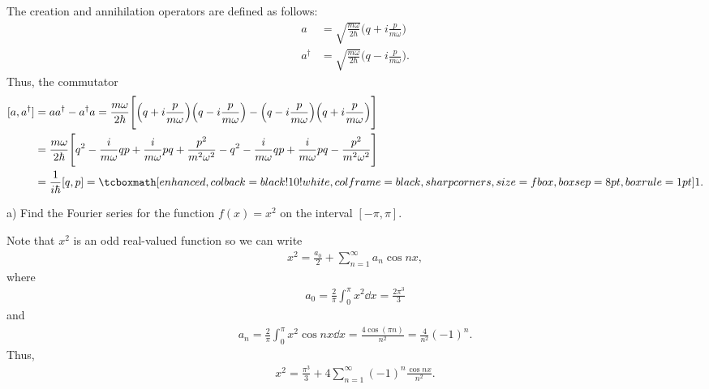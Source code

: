 
The creation and annihilation operators are defined as follows:
\begin{align}
    \label{eq:creation-annihilation-def}
    a &= \sqrt{\frac{m\omega}{2\hbar}}\Big( q + i \frac{p}{m\omega} \Big) \\
    a^{\dagger} &= \sqrt{\frac{m\omega}{2\hbar}}\Big( q - i \frac{p}{m\omega} \Big)
.\end{align}
Thus, the commutator
\begin{align}
    \label{eq:commutator}
    [a,a^{\dagger}] &= a a^{\dagger} - a^{\dagger} a = \frac{m\omega}{2\hbar} \Bigg[ \Big( q + i \frac{p}{m\omega} \Big) \Big( q - i \frac{p}{m\omega} \Big)  - \Big( q - i \frac{p}{m \omega} \Big) \Big( q + i \frac{p}{m \omega} \Big) \Bigg] \notag \\
                    &= \frac{m\omega}{2\hbar} \Bigg[ q^2 - \frac{i}{m \omega} qp + \frac{i}{m \omega} pq + \frac{p^2}{m^2 \omega^2} - q^2 - \frac{i}{m \omega} qp + \frac{i}{m \omega} pq - \frac{p^2}{m^2 \omega^2} \Bigg] \notag \\
                    &= \frac{1}{i \hbar} [q,p] = \eqbox{1}
.\end{align}



a) Find the Fourier series for the function $f(x) = x^2$ on the interval $[-\pi,\pi]$.

Note that $x^2$ is an odd real-valued function so we can write
\begin{eqnarray}
    \label{eq:x2-fourier}
    x^2 = \frac{a_0}{2} + \sum_{n=1}^{\infty} a_{n}\cos{nx}
,\end{eqnarray}
where
\begin{eqnarray}
    \label{eq:a0_x2}
    a_0 = \frac{2}{\pi} \int_{0}^{\pi} x^2 \dd{x} = \frac{2\pi^3}{3}
\end{eqnarray}
and
\begin{eqnarray}
    \label{eq:an_x2}
    a_{n} = \frac{2}{\pi} \int_{0}^{\pi} x^2\cos{nx} \dd{x} = \frac{4 \cos{(\pi n)}}{n^2} = \frac{4}{n^2}(-1)^{n}
.\end{eqnarray}
Thus,
\begin{eqnarray}
    \label{eq:x2-fourier-1}
    x^2 = \frac{\pi^3}{3} + 4 \sum_{n=1}^{\infty} (-1)^{n}\frac{\cos{nx}}{n^2}
.\end{eqnarray}


